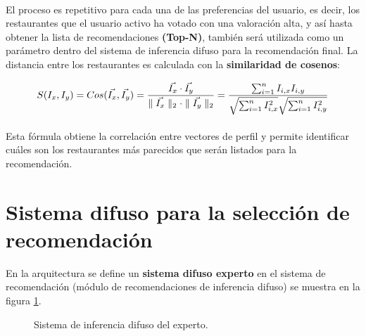 \documentclass[12pt,letterpaper,oneside] {memoir}
\begin{document}
\paragraph{}
El proceso es repetitivo para cada una de las preferencias del usuario, es decir, los restaurantes que el usuario activo ha votado con una valoración alta, y así hasta obtener la lista de recomendaciones \textbf{(Top-N)}, también será utilizada como un parámetro dentro del sistema de inferencia difuso para la recomendación final. La distancia entre los restaurantes es calculada con la \textbf{similaridad de cosenos}:

\begin{equation}
\displaystyle
 S(I_{x},I_{y})= Cos (\vec{I_{x}}, \vec{I_{y}}) ={\vec{I_{x}} \cdot  \vec{I_{y}} \over \parallel \vec{I_{x}} \parallel_{2} \cdot \parallel \vec{I_{y}} \parallel_{2}} = {\sum_{i=1}^{n} I_{i,x} I_{i,y} \over \sqrt{\sum_{i=1}^{n} I_{i,x}^{2}} \sqrt{\sum_{i=1}^{n} I_{i,y}^{2}}} 
\end{equation}
\paragraph{}
Esta fórmula obtiene la correlación entre vectores de perfil y permite identificar cuáles son los restaurantes más parecidos que serán listados para la recomendación.

\section{Sistema difuso para la selección de recomendación}

En la arquitectura se define un \textbf{sistema difuso experto} en el sistema de recomendación (módulo de recomendaciones de inferencia difuso) se muestra en la figura \ref{fig:fisExperto}. \\

\begin{figure}[H] 
\centering 
{} \caption{Sistema de inferencia difuso del experto.} 
\label{fig:fisExperto} 
\end{figure}
\end{document}
